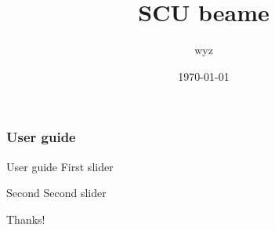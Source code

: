 \documentclass{beamer}
\title{SCU beame }
\author{wyz}
\date{\today}
\begin{document}
\begin{frame}
\maketile
\end{frame}

\begin{frame}
\tableofcontents
  \end{frame}
\begin{frame}
\frametitle{User guide}

\begin{block}{User guide}
First slider
\end{block}

\end{frame}


\begin{frame}
  \begin{block}{Second}
Second slider
    \end{block}
  \end{frame}


\begin{frame}
Thanks!
\end{frame}
\end{document}
